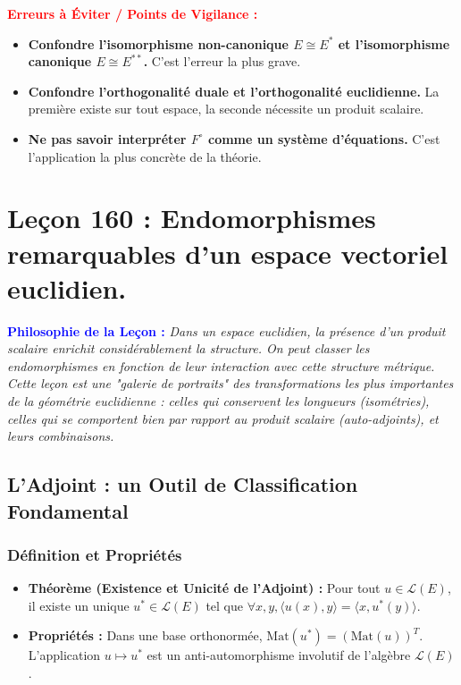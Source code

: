 \documentclass[12pt, a4paper, parskip=full]{report}
\theoremstyle{agregstyle}
\newenvironment{philosophie}
  {\par\medskip\noindent\begin{oframed}\noindent\textbf{\textcolor{blue}{Philosophie de la Leçon :}}\itshape}
  {\end{oframed}\par\medskip}
\newenvironment{erreurs}
  {\par\medskip\noindent\begin{oframed}\noindent\textbf{\textcolor{red}{Erreurs à Éviter / Points de Vigilance :}}}
  {\end{oframed}\par\medskip}
\begin{document}
\begin{erreurs}
    \begin{itemize}
        \item \textbf{Confondre l'isomorphisme non-canonique $E \cong E^*$ et l'isomorphisme canonique $E \cong E^{**}$.} C'est l'erreur la plus grave.
        \item \textbf{Confondre l'orthogonalité duale et l'orthogonalité euclidienne.} La première existe sur tout espace, la seconde nécessite un produit scalaire.
        \item \textbf{Ne pas savoir interpréter $F^\circ$ comme un système d'équations.} C'est l'application la plus concrète de la théorie.
    \end{itemize}
\end{erreurs}

\newpage
\chapter{Leçon 160 : Endomorphismes remarquables d'un espace vectoriel euclidien.}

\begin{philosophie}
    Dans un espace euclidien, la présence d'un produit scalaire enrichit considérablement la structure. On peut classer les endomorphismes en fonction de leur interaction avec cette structure métrique. Cette leçon est une "galerie de portraits" des transformations les plus importantes de la géométrie euclidienne : celles qui conservent les longueurs (isométries), celles qui se comportent bien par rapport au produit scalaire (auto-adjoints), et leurs combinaisons.
\end{philosophie}

\section{L'Adjoint : un Outil de Classification Fondamental}
\subsection{Définition et Propriétés}
\begin{itemize}
    \item \textbf{Théorème (Existence et Unicité de l'Adjoint) :} Pour tout $u \in \mathcal{L}(E)$, il existe un unique $u^* \in \mathcal{L}(E)$ tel que $\forall x,y, \langle u(x), y \rangle = \langle x, u^*(y) \rangle$.
    \item \textbf{Propriétés :} Dans une base orthonormée, $\mathrm{Mat}(u^*) = (\mathrm{Mat}(u))^T$. L'application $u \mapsto u^*$ est un anti-automorphisme involutif de l'algèbre $\mathcal{L}(E)$.
\end{itemize}
\end{document}
